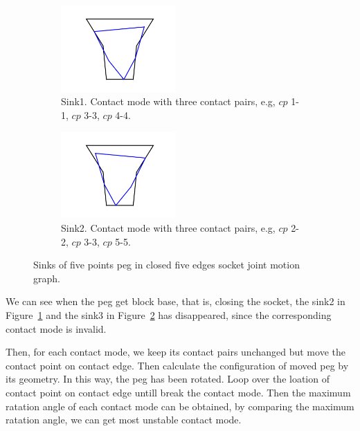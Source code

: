 \begin{figure}
\begin{center}
\begin{subfigure}[t]{0.24\textwidth}
\begin{center}
\includegraphics[height=1.3in]{figures/5_5closed_sink1.png}
\end{center}
\label{fig:5_5closed_sink1}
\caption{Sink1. Contact mode with three contact pairs, e.g, ${cp}$ 1-1, ${cp}$ 3-3, ${cp}$ 4-4. }
\end{subfigure}
\begin{subfigure}[t]{0.24\textwidth}
\begin{center}
\includegraphics[height=1.3in]{figures/5_5closed_sink2.png}
\end{center}
\label{fig:5_5closed_sink2}
\caption{Sink2. Contact mode with three contact pairs, e.g, ${cp}$ 2-2, ${cp}$ 3-3, ${cp}$ 5-5. }
\end{subfigure}
\label{fig:5_5closed_sink}
\caption{Sinks of five points peg in closed five edges socket joint motion graph. }
\end{center}
\end{figure}

We can see when the peg get block base, that is, closing the socket, the sink2 in Figure~\ref{fig:5_5closed_sink1} and the sink3 in Figure~\ref{fig:5_5closed_sink2} has disappeared, since the corresponding contact mode is invalid. 

Then, for each contact mode, we keep its contact pairs unchanged but move the contact point on contact edge. Then calculate the configuration of moved peg by its geometry. In this way, the peg has been rotated. Loop over the loation of contact point on contact edge untill break the contact mode. Then the maximum ratation angle of each contact mode can be obtained, by comparing the maximum ratation angle, we can get most unstable contact mode.

